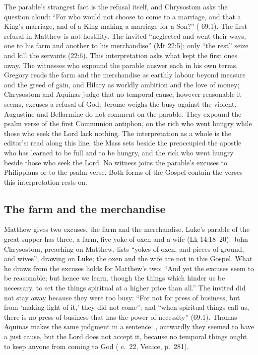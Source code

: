 \label{sec:farm-and-merchandise}

The parable's strangest fact is the refusal itself, and Chrysostom asks the
question aloud: ``For who would not choose to come to a marriage, and that a King's
marriage, and of a King making a marriage for a Son?'' ( 69.1). The first refusal in Matthew is not hostility. The invited
``neglected and went their ways, one to his farm and another to his
merchandise'' (Mt 22:5); only ``the rest'' seize and kill the servants (22:6).
This interpretation asks what kept the first ones away. The witnesses who
expound the parable answer each in his own terms. Gregory reads the farm and
the merchandise as earthly labour beyond measure and the greed of gain, and
Hilary as worldly ambition and the love of money; Chrysostom and Aquinas
judge that no temporal cause, however reasonable it seems, excuses a refusal
of God; Jerome weighs the busy against the violent. Augustine and Bellarmine
do not comment on the parable. They expound the psalm verse of the first
Communion antiphon, on the rich who went hungry while those who seek the Lord
lack nothing. The interpretation as a whole is the editor's: read along this
line, the Mass sets beside the preoccupied the apostle who has learned to be
full and to be hungry, and the rich who went hungry beside those who seek the
Lord. No witness joins the parable's excuses to Philippians or to the psalm
verse. Both forms of the Gospel contain the verses this interpretation rests
on.

\subsection{The farm and the merchandise}

Matthew gives two excuses, the farm and the merchandise. Luke's parable of the
great supper has three, a farm, five yoke of oxen and a wife (Lk 14:18--20).
John Chrysostom, preaching on Matthew, lists ``yokes of oxen, and pieces of
ground, and wives'', drawing on Luke; the oxen and the wife are not in this
Gospel. What he draws from the excuses holds for Matthew's two: ``And yet the
excuses seem to be reasonable; but hence we learn, though the things which
hinder us be necessary, to set the things spiritual at a higher price than
all.'' The invited did not stay away because they were too busy: ``For not for
press of business, but from `making light of it,' they did not come''; and
``when spiritual things call us, there is no press of business that has the
power of necessity'' (69.1). Thomas Aquinas makes the same judgment in a
sentence: , outwardly
they seemed to have a just cause, but the Lord does not accept it, because no
temporal things ought to keep anyone from coming to God (
c.~22, Venice, p.~281).

